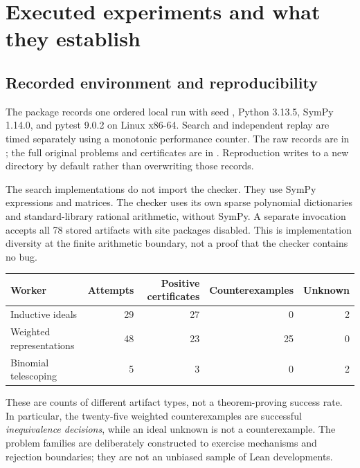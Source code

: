\section{Executed experiments and what they establish}
\label{sec:experiments}

\subsection{Recorded environment and reproducibility}

The package records one ordered local run with seed , Python
3.13.5, SymPy 1.14.0, and pytest 9.0.2 on Linux x86-64. Search and independent
replay are timed separately using a monotonic performance counter. The raw
records are in ; the full original problems and
certificates are in . Reproduction writes to a
new directory by default rather than overwriting those records.

The search implementations do not import the checker. They use SymPy expressions
and matrices. The checker uses its own sparse polynomial dictionaries and
standard-library rational arithmetic, without SymPy. A separate invocation
 accepts all 78 stored artifacts with site packages
disabled. This is implementation diversity at the finite arithmetic boundary,
not a proof that the checker contains no bug.

\begin{center}
\begin{tabular}{@{}lrrrr@{}}\toprule
Worker & Attempts & Positive certificates & Counterexamples & Unknown \\
\midrule
Inductive ideals & 29 & 27 & 0 & 2 \\
Weighted representations & 48 & 23 & 25 & 0 \\
Binomial telescoping & 5 & 3 & 0 & 2 \\
\bottomrule\end{tabular}
\end{center}

These are counts of different artifact types, not a theorem-proving success
rate. In particular, the twenty-five weighted counterexamples are successful
\emph{inequivalence decisions}, while an ideal unknown is not a counterexample.
The problem families are deliberately constructed to exercise mechanisms and
rejection boundaries; they are not an unbiased sample of Lean developments.

